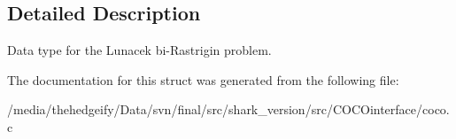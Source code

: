 \subsection{Detailed Description}
Data type for the Lunacek bi-\/\+Rastrigin problem. 

The documentation for this struct was generated from the following file\+:\begin{DoxyCompactItemize}
\item 
/media/thehedgeify/\+Data/svn/final/src/shark\+\_\+version/src/\+C\+O\+C\+Ointerface/coco.\+c\end{DoxyCompactItemize}
